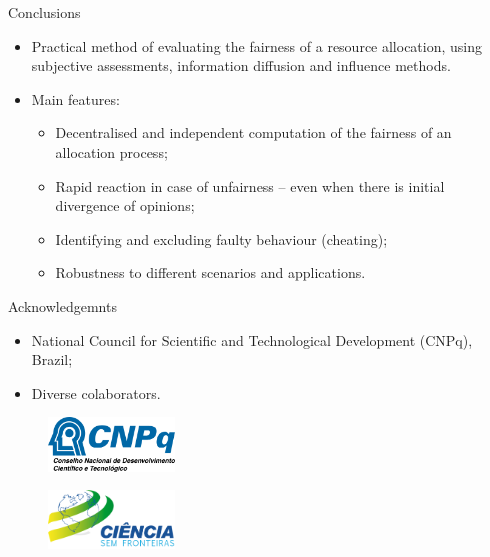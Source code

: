 \begin{frame}{Conclusions}

\begin{itemize}
\tightlist
\item
  Practical method of evaluating the fairness of a resource allocation,
  using subjective assessments, information diffusion and influence
  methods.
\item
  Main features:

  \begin{itemize}
  \tightlist
  \item
    Decentralised and independent computation of the fairness of an
    allocation process;
  \item
    Rapid reaction in case of unfairness -- even when there is initial
    divergence of opinions;
  \item
    Identifying and excluding faulty behaviour (cheating);
  \item
    Robustness to different scenarios and applications.
  \end{itemize}
\end{itemize}

\end{frame}

\begin{frame}{Acknowledgemnts}

\begin{itemize}
\item
  National Council for Scientific and Technological Development (CNPq),
  Brazil;
\item
  Diverse colaborators.
\end{itemize}

\begin{figure}
\centering
\includegraphics[width=0.3\textwidth]{cnpq.png}
\end{figure}

\begin{figure}
\centering
\includegraphics[width=0.3\textwidth]{csf.png}
\end{figure}

\end{frame}
